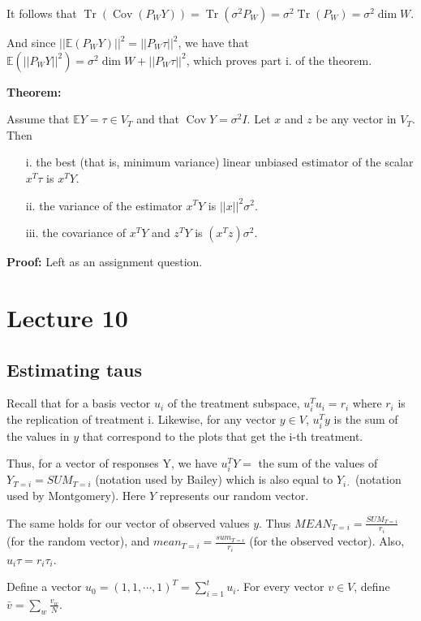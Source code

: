 \documentclass[12pt, oneside]{article}
\newcommand{\E}{\mathbb{E}}
\newcommand{\Cov}{\operatorname{Cov}}
\DeclareMathOperator{\Tr}{Tr}
\begin{document}
It follows that $\Tr (\Cov (P_{W} Y)) = \Tr (\sigma^{2} P_{W}) = \sigma^{2} \Tr (P_{W}) = \sigma^{2} \dim W$.


And since $|| \E (P_{W} Y) ||^{2}  = ||P_{W} \tau ||^{2}$, we have that $ \E ( || P_{W} Y ||^{2}) = \sigma^{2} \dim W + || P_{W} \tau ||^{2}$,
which proves part i. of the theorem.

\textbf{Theorem:}

Assume that $\E Y = \tau \in V_{T}$ and that $\Cov Y = \sigma^{2} I$. Let $x$ and $z$ be any vector in $V_{T}$. Then 
\begin{enumerate}
\item[i. ] the best (that is, minimum variance) linear unbiased estimator of the scalar $x^{T}\tau$ is $x^{T} Y$. 
\item[ii. ] the variance of the estimator $x^{T} Y$ is $||x||^{2} \sigma^{2}$.
\item[iii. ] the covariance of $x^{T}Y$ and $z^{T} Y$ is $(x^{T}z)\sigma^{2}$.  
\end{enumerate}

\textbf{Proof:} Left as an assignment question.

\section{Lecture 10}

\subsection{Estimating taus}

Recall that for a basis vector $u_{i}$ of the treatment subspace, $u_{i}^{T} u_{i} = r_{i}$ where $r_{i}$ is the replication 
of treatment i. Likewise, for any vector $y \in V$, $u_{i}^{T}y$ is the sum of the values in $y$ that correspond to the plots that get
the i-th treatment.  

Thus, for a vector of responses Y, we have $u_{i}^{T}Y=$ the sum of the values of $Y_{T = i} = SUM_{T=i}$ (notation used by Bailey)
which is also equal to $Y_{i \cdot}$ (notation used by Montgomery). Here $Y$ represents our random vector. 

The same holds for our vector of observed values $y$. Thus $MEAN_{T = i} = \frac{SUM_{T = i}}{r_{i}}$ (for the random vector), and 
$mean_{T = i} = \frac{sum_{T = i}}{r_{i}}$ (for the observed vector). Also, $u_{i} \tau = r_{i} \tau_{i}$. 

Define a vector $u_{0} = (1, 1,  \cdots, 1)^{T} = \sum_{i = 1}^{t} u_{i}$. For every vector $v \in V$, define 
$\bar{v} = \sum_{w} \frac{v_{w}}{N}$. 
\end{document}
